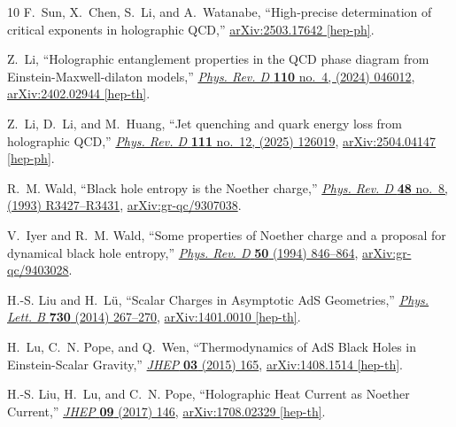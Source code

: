 \documentclass[a4paper,12pt]{article}
\numberwithin{equation}{section}
\begin{document}
\begin{thebibliography}{10}
	F.~Sun, X.~Chen, S.~Li, and A.~Watanabe, ``{High-precise determination of
		critical exponents in holographic QCD},''
	\href{http://arxiv.org/abs/2503.17642}{{\ttfamily arXiv:2503.17642
			[hep-ph]}}.
	
	Z.~Li, ``{Holographic entanglement properties in the QCD phase diagram from
		Einstein-Maxwell-dilaton models},''
	\href{http://dx.doi.org/10.1103/PhysRevD.110.046012}{{\em Phys. Rev. D}
		{\bfseries 110} no.~4, (2024) 046012},
	\href{http://arxiv.org/abs/2402.02944}{{\ttfamily arXiv:2402.02944
			[hep-th]}}.
	
	Z.~Li, D.~Li, and M.~Huang, ``{Jet quenching and quark energy loss from
		holographic QCD},'' \href{http://dx.doi.org/10.1103/52sx-qvy8}{{\em Phys.
			Rev. D} {\bfseries 111} no.~12, (2025) 126019},
	\href{http://arxiv.org/abs/2504.04147}{{\ttfamily arXiv:2504.04147
			[hep-ph]}}.
	
	R.~M. Wald, ``{Black hole entropy is the Noether charge},''
	\href{http://dx.doi.org/10.1103/PhysRevD.48.R3427}{{\em Phys. Rev. D}
		{\bfseries 48} no.~8, (1993) R3427--R3431},
	\href{http://arxiv.org/abs/gr-qc/9307038}{{\ttfamily arXiv:gr-qc/9307038}}.
	
	V.~Iyer and R.~M. Wald, ``{Some properties of Noether charge and a proposal for
		dynamical black hole entropy},''
	\href{http://dx.doi.org/10.1103/PhysRevD.50.846}{{\em Phys. Rev. D}
		{\bfseries 50} (1994) 846--864},
	\href{http://arxiv.org/abs/gr-qc/9403028}{{\ttfamily arXiv:gr-qc/9403028}}.
	
	H.-S. Liu and H.~L\"u, ``{Scalar Charges in Asymptotic AdS Geometries},''
	\href{http://dx.doi.org/10.1016/j.physletb.2014.01.056}{{\em Phys. Lett. B}
		{\bfseries 730} (2014) 267--270},
	\href{http://arxiv.org/abs/1401.0010}{{\ttfamily arXiv:1401.0010 [hep-th]}}.
	
	H.~Lu, C.~N. Pope, and Q.~Wen, ``{Thermodynamics of AdS Black Holes in
		Einstein-Scalar Gravity},''
	\href{http://dx.doi.org/10.1007/JHEP03(2015)165}{{\em JHEP} {\bfseries 03}
		(2015) 165}, \href{http://arxiv.org/abs/1408.1514}{{\ttfamily arXiv:1408.1514
			[hep-th]}}.
	
	H.-S. Liu, H.~Lu, and C.~N. Pope, ``{Holographic Heat Current as Noether
		Current},'' \href{http://dx.doi.org/10.1007/JHEP09(2017)146}{{\em JHEP}
		{\bfseries 09} (2017) 146}, \href{http://arxiv.org/abs/1708.02329}{{\ttfamily
			arXiv:1708.02329 [hep-th]}}.
	

\end{thebibliography}
\end{document}
